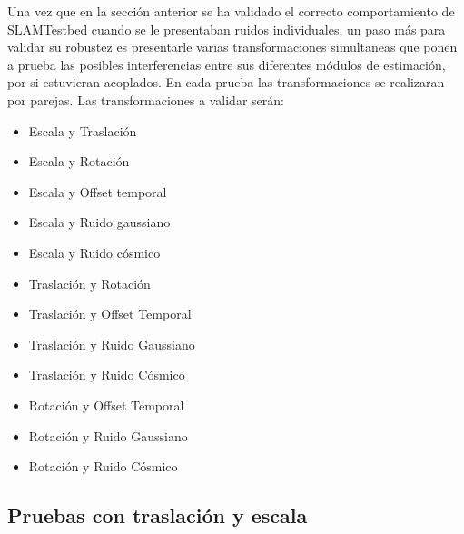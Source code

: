 Una vez que en la sección anterior se ha validado el correcto comportamiento de SLAMTestbed cuando se le presentaban ruidos individuales, un paso más para validar su robustez es presentarle varias transformaciones simultaneas que ponen a prueba las posibles interferencias entre sus diferentes módulos de estimación, por si estuvieran acoplados. En cada prueba las transformaciones se realizaran por parejas.
Las transformaciones  a validar serán:
\begin{itemize}
 \item{Escala y Traslación}
 \item{Escala y Rotación}
 \item{Escala y Offset temporal}
 \item{Escala y Ruido gaussiano}
 \item{Escala y Ruido cósmico}

 \item{Traslación y Rotación}
 \item{Traslación y Offset Temporal}
 \item{Traslación y Ruido Gaussiano}
 \item{Traslación y Ruido Cósmico}

 \item{Rotación y Offset Temporal}
 \item{Rotación y Ruido Gaussiano}
 \item{Rotación y Ruido Cósmico}
\end{itemize}





\subsection{Pruebas con traslación y escala}

